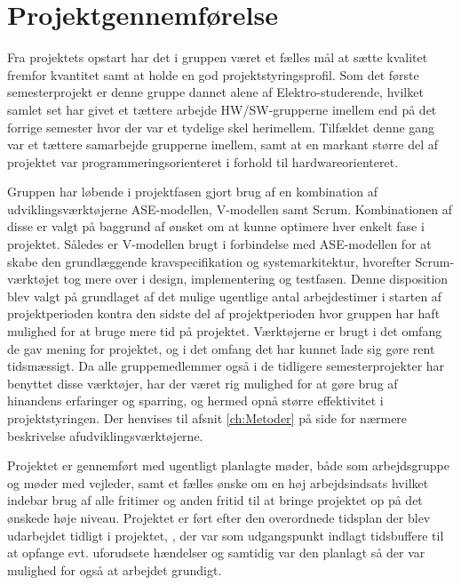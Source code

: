\section{Projektgennemførelse} \label{ch:Projektgennemfoerelse}


Fra projektets opstart har det i gruppen været et fælles mål at sætte kvalitet fremfor kvantitet samt at holde en god projektstyringsprofil.  
Som  det første semesterprojekt er denne gruppe dannet alene af Elektro-studerende, hvilket samlet set har givet et tættere arbejde HW/SW-grupperne imellem end på det forrige semester hvor der var et tydelige skel herimellem. 
Tilfældet denne gang var et tættere samarbejde grupperne imellem, samt at en markant større del af projektet var programmeringsorienteret i forhold til hardwareorienteret. 

Gruppen har løbende i projektfasen gjort brug af en kombination af udviklingsværktøjerne ASE-modellen, V-modellen samt Scrum. 
Kombinationen af disse er valgt på baggrund af ønsket om at kunne optimere hver enkelt fase i projektet.
Således er V-modellen brugt i forbindelse med ASE-modellen for at skabe den grundlæggende kravspecifikation og systemarkitektur, hvorefter Scrum-værktøjet tog mere over i design, implementering og testfasen. 
Denne disposition blev valgt på grundlaget af det mulige ugentlige antal arbejdestimer i starten af projektperioden kontra den sidste del af projektperioden hvor gruppen har haft mulighed for at bruge mere tid på projektet.
Værktøjerne er brugt i det omfang de gav mening for projektet, og i det omfang det har kunnet lade sig gøre rent tidsmæssigt. 
Da alle gruppemedlemmer også i de tidligere semesterprojekter har benyttet disse værktøjer, har der været rig mulighed for at gøre brug af hinandens erfaringer og sparring,  og hermed opnå større effektivitet i projektstyringen. 
Der henvises til afsnit \ref{ch:Metoder}  på side \pageref{ch:Metoder} for nærmere beskrivelse afudviklingsværktøjerne.

Projektet er gennemført med ugentligt planlagte møder, både som arbejdsgruppe og møder med vejleder, samt et fælles ønske om en høj arbejdsindsats hvilket indebar brug af alle fritimer og anden fritid til at bringe projektet op på det ønskede høje niveau. 
Projektet er ført efter den overordnede tidsplan der blev udarbejdet tidligt i projektet, \cite{lib:Tidsplan}, der var som udgangspunkt indlagt tidsbuffere til at opfange evt. uforudsete hændelser og samtidig var den planlagt så der var mulighed for også at arbejdet grundigt.

